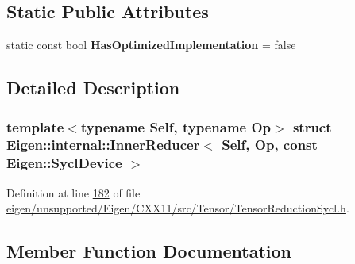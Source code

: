 \subsection*{Static Public Attributes}
\begin{DoxyCompactItemize}
\item 
\mbox{\label{struct_eigen_1_1internal_1_1_inner_reducer_3_01_self_00_01_op_00_01const_01_eigen_1_1_sycl_device_01_4_a6b7125b92be6e7afc0f7619c73f20688}} 
static const bool {\bfseries Has\+Optimized\+Implementation} = false
\end{DoxyCompactItemize}


\subsection{Detailed Description}
\subsubsection*{template$<$typename Self, typename Op$>$\newline
struct Eigen\+::internal\+::\+Inner\+Reducer$<$ Self, Op, const Eigen\+::\+Sycl\+Device $>$}



Definition at line \hyperlink{eigen_2unsupported_2_eigen_2_c_x_x11_2src_2_tensor_2_tensor_reduction_sycl_8h_source_l00182}{182} of file \hyperlink{eigen_2unsupported_2_eigen_2_c_x_x11_2src_2_tensor_2_tensor_reduction_sycl_8h_source}{eigen/unsupported/\+Eigen/\+C\+X\+X11/src/\+Tensor/\+Tensor\+Reduction\+Sycl.\+h}.



\subsection{Member Function Documentation}
\mbox{\label{struct_eigen_1_1internal_1_1_inner_reducer_3_01_self_00_01_op_00_01const_01_eigen_1_1_sycl_device_01_4_a471bb175078f166e0d5c4040fc4494d9}} 
